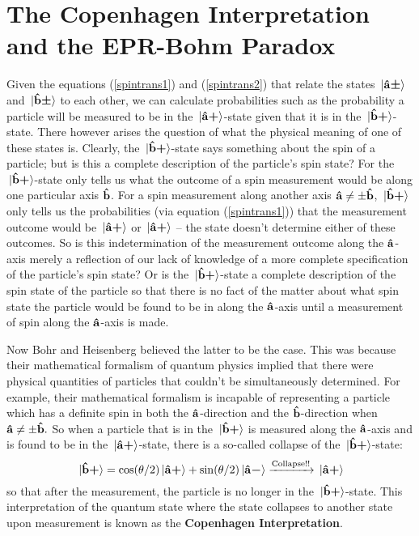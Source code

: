 \section{The Copenhagen Interpretation and the EPR-Bohm Paradox}
Given the equations (\ref{spintrans1}) and (\ref{spintrans2}) that  relate the states $\ket*{\vb{\hat{{a}}}\bm{\pm}}$ and $\ket*{\vb{\hat{{b}}}\bm{\pm}}$ to each other, we can calculate probabilities such as the probability a particle will be measured to be in the $\ket*{\vb{\hat{{a}}}\bm{+}}$-state given that it is in the $\ket*{\vb{\hat{{b}}}\bm{+}}$-state. There however arises the question of what the physical meaning of one of these states is. Clearly, the $\ket*{\vb{\hat{{b}}}\bm{+}}$-state says something about the spin of a particle; but is this a complete description of the particle's spin state? For the $\ket*{\vb{\hat{{b}}}\bm{+}}$-state only tells us what the outcome of a spin measurement would be along one particular axis $\vb{\hat{{b}}}$. For a spin measurement along another axis $\vb{\hat{{a}}}\neq\pm\vb{\hat{{b}}}$, $\ket*{\vb{\hat{{b}}}\bm{+}}$ only tells us the probabilities (via equation (\ref{spintrans1})) that the measurement outcome would be $\ket*{\vb{\hat{{a}}}\bm{+}}$ or $\ket*{\vb{\hat{{a}}}\bm{+}}$ -- the state doesn't determine either of these outcomes. So is this indetermination of the measurement outcome along the $\vb{\hat{{a}}}$-axis merely a reflection of our lack of knowledge of a more complete specification of the particle's spin state? Or is the  $\ket*{\vb{\hat{{b}}}\bm{+}}$-state a complete description of the spin state of the particle so that there is no fact of the matter about what spin state the particle would be found to be in along the $\vb{\hat{{a}}}$-axis until a measurement of spin along the $\vb{\hat{{a}}}$-axis is made. 

Now Bohr and Heisenberg believed the latter to be the case. This was because their mathematical formalism of quantum physics implied that there were physical quantities of particles that couldn't be simultaneously determined. For example, their mathematical formalism is incapable of representing a particle which has a definite spin in both the $\vb{\hat{{a}}}$-direction and the $\vb{\hat{{b}}}$-direction when $\vb{\hat{{a}}}\neq\pm\vb{\hat{{b}}}.$ So when a particle that is in the $\ket*{\vb{\hat{{b}}}\bm{+}}$ is measured along the $\vb{\hat{{a}}}$-axis and is found to be in the $\ket*{\vb{\hat{{a}}}\bm{+}}$-state, there is a so-called collapse of the $\ket*{\vb{\hat{{b}}}\bm{+}}$-state:
$$ \ket*{\vb{\hat{{b}}}\bm{+}}= \cos(\theta/2)\ket*{\vb{\hat{{a}}}\bm{+}}+\sin(\theta/2) \ket*{\vb{\hat{{a}}}\bm{-}}\xrightarrow{\text{Collapse!!}}\ket*{\vb{\hat{{a}}}\bm{+}}$$
so that after the measurement, the particle is no longer in the $\ket*{\vb{\hat{{b}}}\bm{+}}$-state. This interpretation of the quantum state where the state collapses to another state upon measurement is known as the \textbf{Copenhagen Interpretation}.


